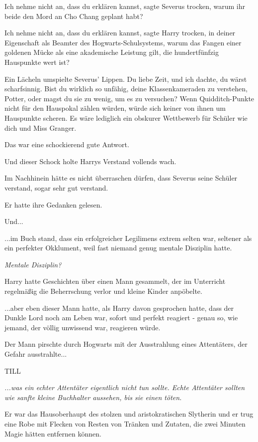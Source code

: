 \glqq{}Ich nehme nicht an, dass du erklären kannst\grqq{}, sagte Severus
trocken, \glqq{}warum ihr beide den Mord an Cho Chang geplant habt?\grqq{}

\glqq{}Ich nehme nicht an, dass du erklären kannst\grqq{}, sagte Harry trocken,
\glqq{}in deiner Eigenschaft als Beamter des Hogwarts-Schulsystems, warum das
Fangen einer goldenen Mücke als eine akademische Leistung gilt, die
hundertfünfzig Hauspunkte wert ist?\grqq{}

Ein Lächeln umspielte Severus' Lippen. \glqq{}Du liebe Zeit, und ich dachte, du
wärst scharfsinnig. Bist du wirklich so unfähig, deine Klassenkameraden zu
verstehen, Potter, oder magst du sie zu wenig, um es zu versuchen? Wenn
Quidditch-Punkte nicht für den Hauspokal zählen würden, würde sich keiner von
ihnen um Hauspunkte scheren. Es wäre lediglich ein obskurer Wettbewerb für
Schüler wie dich und Miss Granger.\grqq{}

Das war eine schockierend gute Antwort.

Und dieser Schock holte Harrys Verstand vollends wach.

Im Nachhinein hätte es nicht überraschen dürfen, dass Severus seine Schüler
verstand, sogar sehr gut verstand.

Er hatte ihre Gedanken gelesen.

Und...

...im Buch stand, dass ein erfolgreicher Legilimens extrem selten war, seltener
als ein perfekter Okklument, weil fast niemand genug mentale Disziplin hatte.

\emph{Mentale Disziplin?}

Harry hatte Geschichten über einen Mann gesammelt, der im Unterricht regelmäßig
die Beherrschung verlor und kleine Kinder anpöbelte.

...aber eben dieser Mann hatte, als Harry davon gesprochen hatte, dass der
Dunkle Lord noch am Leben war, sofort und perfekt reagiert - genau so, wie
jemand, der völlig unwissend war, reagieren würde.

Der Mann pirschte durch Hogwarts mit der Ausstrahlung eines Attentäters, der
Gefahr ausstrahlte...

TILL

\emph{...was ein echter Attentäter eigentlich nicht tun sollte. Echte Attentäter
sollten wie sanfte kleine Buchhalter aussehen, bis sie einen töten.}

Er war das Hausoberhaupt des stolzen und aristokratischen Slytherin und er trug
eine Robe mit Flecken von Resten von Tränken und Zutaten, die zwei Minuten Magie
hätten entfernen können.

